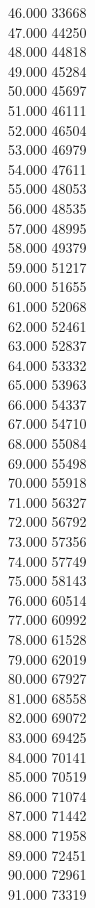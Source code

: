 { 46.000	33668 \\
 47.000	44250 \\
 48.000	44818 \\
 49.000	45284 \\
 50.000	45697 \\
 51.000	46111 \\
 52.000	46504 \\
 53.000	46979 \\
 54.000	47611 \\
 55.000	48053 \\
 56.000	48535 \\
 57.000	48995 \\
 58.000	49379 \\
 59.000	51217 \\
 60.000	51655 \\
 61.000	52068 \\
 62.000	52461 \\
 63.000	52837 \\
 64.000	53332 \\
 65.000	53963 \\
 66.000	54337 \\
 67.000	54710 \\
 68.000	55084 \\
 69.000	55498 \\
 70.000	55918 \\
 71.000	56327 \\
 72.000	56792 \\
 73.000	57356 \\
 74.000	57749 \\
 75.000	58143 \\
 76.000	60514 \\
 77.000	60992 \\
 78.000	61528 \\
 79.000	62019 \\
 80.000	67927 \\
 81.000	68558 \\
 82.000	69072 \\
 83.000	69425 \\
 84.000	70141 \\
 85.000	70519 \\
 86.000	71074 \\
 87.000	71442 \\
 88.000	71958 \\
 89.000	72451 \\
 90.000	72961 \\
 91.000	73319 \\
}
